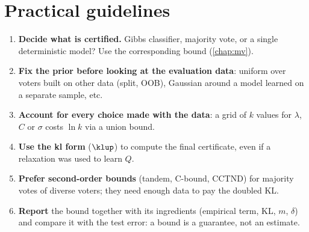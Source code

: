 \section{Practical guidelines}

\begin{enumerate}
\item \textbf{Decide what is certified.} Gibbs classifier, majority vote, or a
      single deterministic model? Use the corresponding bound (\cref{chap:mv}).
\item \textbf{Fix the prior before looking at the evaluation data}: uniform over
      voters built on other data (split, OOB), Gaussian around a model learned on a
      separate sample, etc.
\item \textbf{Account for every choice made with the data}: a grid of $k$ values for
      $\lambda$, $C$ or $\sigma$ costs $\ln k$ via a union bound.
\item \textbf{Use the kl form} ($\klup$) to compute the final certificate, even if a
      relaxation was used to learn $Q$.
\item \textbf{Prefer second-order bounds} (tandem, C-bound, CCTND) for majority
      votes of diverse voters; they need enough data to pay the doubled KL.
\item \textbf{Report} the bound together with its ingredients (empirical term, KL,
      $m$, $\delta$) and compare it with the test error: a bound is a guarantee,
      not an estimate.
\end{enumerate}
